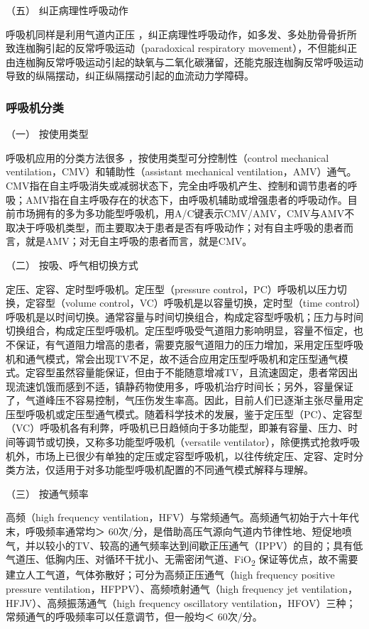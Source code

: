 \hypertarget{text00367.htmlux5cux23CHP16-3-1-1-5}{}
（五） 纠正病理性呼吸动作

呼吸机同样是利用气道内正压
，纠正病理性呼吸动作，如多发、多处肋骨骨折所致连枷胸引起的反常呼吸运动（paradoxical
respiratory
movement），不但能纠正由连枷胸反常呼吸运动引起的缺氧与二氧化碳潴留，还能克服连枷胸反常呼吸运动导致的纵隔摆动，纠正纵隔摆动引起的血流动力学障碍。

\subsubsection{呼吸机分类}

\hypertarget{text00367.htmlux5cux23CHP16-3-1-2-1}{}
（一） 按使用类型

呼吸机应用的分类方法很多 ，按使用类型可分控制性（control mechanical
ventilation，CMV）和辅助性（assistant mechanical
ventilation，AMV）通气。CMV指在自主呼吸消失或减弱状态下，完全由呼吸机产生、控制和调节患者的呼吸；AMV指在自主呼吸存在的状态下，由呼吸机辅助或增强患者的呼吸动作。目前市场拥有的多为多功能型呼吸机，用A/C键表示CMV/AMV，CMV与AMV不取决于呼吸机类型，而主要取决于患者是否有呼吸动作；对有自主呼吸的患者而言，就是AMV；对无自主呼吸的患者而言，就是CMV。

\hypertarget{text00367.htmlux5cux23CHP16-3-1-2-2}{}
（二） 按吸、呼气相切换方式

定压、定容、定时型呼吸机。定压型（pressure
control，PC）呼吸机以压力切换，定容型（volume
control，VC）呼吸机是以容量切换，定时型（time
control）呼吸机是以时间切换。通常容量与时间切换组合，构成定容型呼吸机；压力与时间切换组合，构成定压型呼吸机。定压型呼吸受气道阻力影响明显，容量不恒定，也不保证，有气道阻力增高的患者，需要克服气道阻力的压力增加，采用定压型呼吸机和通气模式，常会出现TV不足，故不适合应用定压型呼吸机和定压型通气模式。定容型虽然容量能保证，但由于不能随意增减TV，且流速固定，患者常因出现流速饥饿而感到不适，镇静药物使用多，呼吸机治疗时间长；另外，容量保证了，气道峰压不容易控制，气压伤发生率高。因此，目前人们已逐渐主张尽量用定压型呼吸机或定压型通气模式。随着科学技术的发展，鉴于定压型（PC）、定容型（VC）呼吸机各有利弊，呼吸机已日趋倾向于多功能型，即兼有容量、压力、时间等调节或切换，又称多功能型呼吸机（versatile
ventilator），除便携式抢救呼吸机外，市场上已很少有单独的定压或定容型呼吸机，以往传统定压、定容、定时分类方法，仅适用于对多功能型呼吸机配置的不同通气模式解释与理解。

\hypertarget{text00367.htmlux5cux23CHP16-3-1-2-3}{}
（三） 按通气频率

高频（high frequency
ventilation，HFV）与常频通气。高频通气初始于六十年代末，呼吸频率通常均＞
60次/分，是借助高压气源向气道内节律性地、短促地喷气，并以较小的TV、较高的通气频率达到间歇正压通气（IPPV）的目的；具有低气道压、低胸内压、对循环干扰小、无需密闭气道、FiO\textsubscript{2}
保证等优点，故不需要建立人工气道，气体弥散好；可分为高频正压通气（high
frequency positive pressure ventilation，HFPPV）、高频喷射通气（high
frequency jet ventilation，HFJV）、高频振荡通气（high frequency
oscillatory
ventilation，HFOV）三种；常频通气的呼吸频率可以任意调节，但一般均＜
60次/分。

